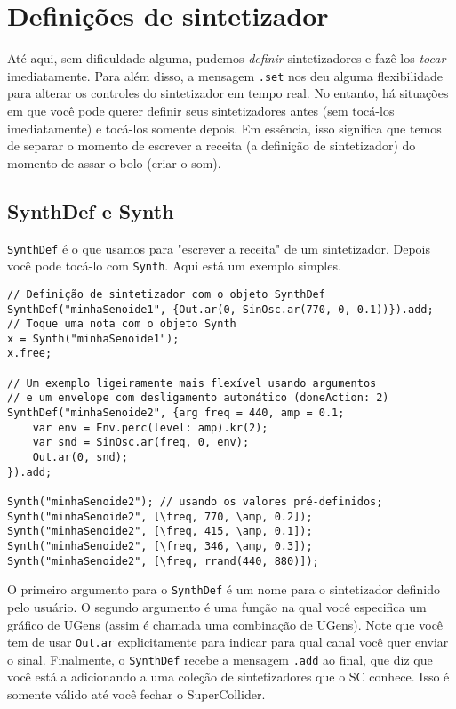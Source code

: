 \section{Definições de sintetizador}
\label{sec:synthdef}

Até aqui, sem dificuldade alguma, pudemos \emph{definir} sintetizadores e fazê-los \emph{tocar} imediatamente. Para além disso, a mensagem \texttt{.set} nos deu alguma flexibilidade para alterar os controles do sintetizador em tempo real. No entanto, há situações em que você pode querer definir seus sintetizadores antes (sem tocá-los imediatamente) e tocá-los somente depois. Em essência, isso significa que temos de separar o momento de escrever a receita (a definição de sintetizador) do momento de assar o bolo (criar o som).


\subsection{SynthDef e Synth}

\texttt{SynthDef} é o que usamos para "escrever a receita" de um sintetizador. Depois você pode tocá-lo com \texttt{Synth}. Aqui está um exemplo simples.

\begin{lstlisting}[style=SuperCollider-IDE, basicstyle=\scttfamily\footnotesize]
// Definição de sintetizador com o objeto SynthDef
SynthDef("minhaSenoide1", {Out.ar(0, SinOsc.ar(770, 0, 0.1))}).add;
// Toque uma nota com o objeto Synth
x = Synth("minhaSenoide1");
x.free;

// Um exemplo ligeiramente mais flexível usando argumentos
// e um envelope com desligamento automático (doneAction: 2)
SynthDef("minhaSenoide2", {arg freq = 440, amp = 0.1; 
	var env = Env.perc(level: amp).kr(2);
	var snd = SinOsc.ar(freq, 0, env);
	Out.ar(0, snd);
}).add;

Synth("minhaSenoide2"); // usando os valores pré-definidos;
Synth("minhaSenoide2", [\freq, 770, \amp, 0.2]);
Synth("minhaSenoide2", [\freq, 415, \amp, 0.1]);
Synth("minhaSenoide2", [\freq, 346, \amp, 0.3]);
Synth("minhaSenoide2", [\freq, rrand(440, 880)]);
\end{lstlisting}

O primeiro argumento para o \texttt{SynthDef} é um nome para o sintetizador definido pelo usuário. O segundo argumento é uma função na qual você especifica um gráfico de UGens (assim é chamada uma combinação de UGens). Note que você tem de usar \texttt{Out.ar} explicitamente para indicar para qual canal você quer enviar o sinal. Finalmente, o \texttt{SynthDef} recebe a mensagem  \texttt{.add} ao final, que diz que você está a adicionando a uma coleção de sintetizadores que o SC conhece. Isso é somente válido até você fechar o SuperCollider.

